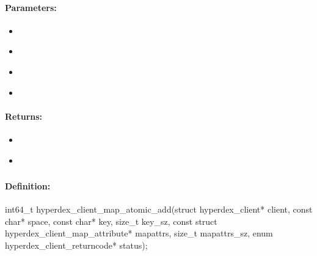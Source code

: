 \paragraph{Parameters:}
\begin{itemize}[noitemsep]
\item {}\\

\item {}\\

\item {}\\

\item {}\\

\end{itemize}

\paragraph{Returns:}
\begin{itemize}[noitemsep]
\item {}\\

\item {}\\

\end{itemize}

\pagebreak
\subsubsection{}
\label{api:c:map_atomic_add}


\paragraph{Definition:}
\begin{ccode}
int64_t hyperdex_client_map_atomic_add(struct hyperdex_client* client,
        const char* space,
        const char* key, size_t key_sz,
        const struct hyperdex_client_map_attribute* mapattrs, size_t mapattrs_sz,
        enum hyperdex_client_returncode* status);
\end{ccode}

